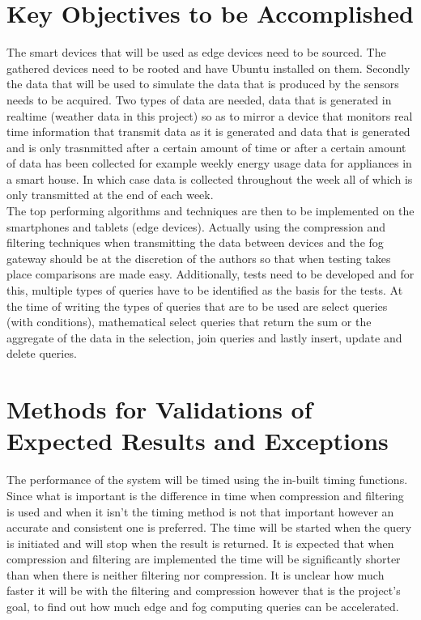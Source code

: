 \documentclass[11pt,journal, a4paper]{IEEEtran}
\begin{document}

\section{Key Objectives to be Accomplished}
\noindent
The smart devices that will be used as edge devices need to be sourced. The gathered devices need to be rooted and have Ubuntu installed on them. Secondly the data that will be used to simulate the data that is produced by the sensors needs to be acquired. Two types of data are needed, data that is generated in realtime (weather data in this project) so as to mirror a device that monitors real time information that transmit data as it is generated and data that is generated and is only trasnmitted after a certain amount of time or after a certain amount of data has been collected for example weekly energy usage data for appliances in a smart house. In which case data is collected throughout the week all of which is only transmitted at the end of each week.\\

\noindent
The top performing algorithms and techniques are then to be implemented on the smartphones and tablets (edge devices). Actually using the compression and filtering techniques when transmitting the data between devices and the fog gateway should be at the discretion of the authors so that when testing takes place comparisons are made easy. Additionally, tests need to be developed and for this, multiple types of queries have to be identified as the basis for the tests. At the time of writing the types of queries that are to be used are select queries (with conditions), mathematical select queries that return the sum or the aggregate of the data in the selection, join queries and lastly insert, update and delete queries. 



\section{Methods for Validations of Expected Results and Exceptions}
\noindent
The performance of the system will be timed using the in-built timing functions. Since what is important is the difference in time when compression and filtering is used and when it isn't the timing method is not that important however an accurate and consistent one is preferred. The time will be started when the query is initiated and will stop when the result is returned. It is expected that when compression and filtering are implemented the time will be significantly shorter than when there is neither filtering nor compression. It is unclear how much faster it will be with the filtering and compression however that is the project's goal, to find out how much edge and fog computing queries can be accelerated. \\
\end{document}
